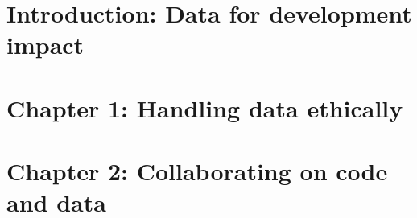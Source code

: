 %
%
%
%




\cleardoublepage
\chapter{Introduction: Data for development impact} %





\chapter{Chapter 1: Handling data ethically}
\label{ch:1}




\chapter{Chapter 2: Collaborating on code and data}
\label{ch:2}




